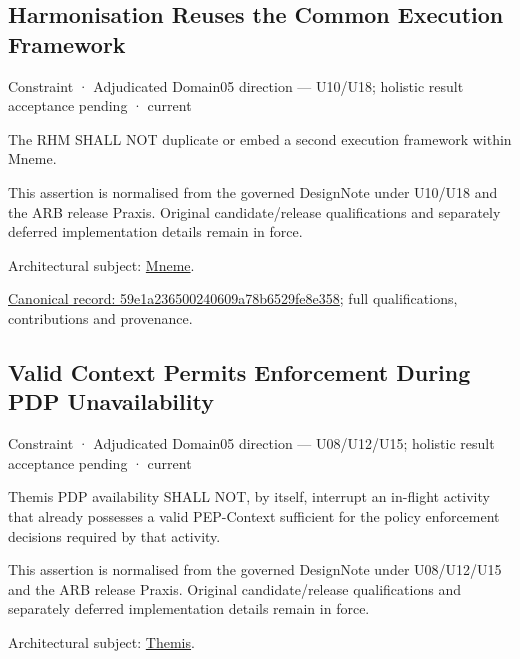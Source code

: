 \subsection{Harmonisation Reuses the Common Execution Framework}

\label{element:59e1a236500240609a78b6529fe8e358}
{\small Constraint · Adjudicated Domain05 direction — U10/U18; holistic result acceptance pending · current}\par

The RHM SHALL NOT duplicate or embed a second execution framework within Mneme.



This assertion is normalised from the governed DesignNote under U10/U18 and the ARB release Praxis. Original candidate/release qualifications and separately deferred implementation details remain in force.



Architectural subject: \hyperref[element:1af8a56358f7429fabfb57be66542a99]{Mneme}.


{\footnotesize \href{../../../../continuum/motivation/constraint/59e1a236500240609a78b6529fe8e358.md}{Canonical record: 59e1a236500240609a78b6529fe8e358}; full qualifications, contributions and provenance.}\par
\subsection{Valid Context Permits Enforcement During PDP Unavailability}

\label{element:5a6285eb1a1646e1badd693b8c175f01}
{\small Constraint · Adjudicated Domain05 direction — U08/U12/U15; holistic result acceptance pending · current}\par

Themis PDP availability SHALL NOT, by itself, interrupt an in-flight activity that already possesses a valid PEP-Context sufficient for the policy enforcement decisions required by that activity.



This assertion is normalised from the governed DesignNote under U08/U12/U15 and the ARB release Praxis. Original candidate/release qualifications and separately deferred implementation details remain in force.



Architectural subject: \hyperref[element:899d34ec491948b68aad09e507dea6d1]{Themis}.



